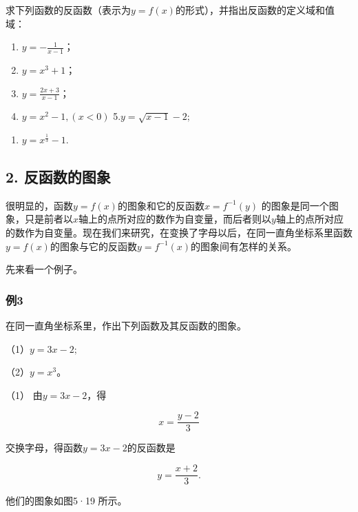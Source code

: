 求下列函数的反函数（表示为\(y=f(x)\)的形式），并指出反函数的定义域和值域：

\begin{enumerate}[start=1]
\item
  \(y = -\frac{1}{x - 1}\)；
\item
  \(y = x^{3} + 1\)；
\item
  \(y = \frac{2x + 3}{x - 1}\)；
\item
  \(y = x^{2} - 1, (x < 0)\) 5.\(y = \sqrt{x - 1} - 2;\)
\end{enumerate}
\begin{enumerate}[start=6]
\item
  \(y = x^{\frac{1}{3}} - 1.\)
\end{enumerate}

\subsection{2. 反函数的图象}

很明显的，函数\(y = f(x)\)的图象和它的反函数\(x = f^{-1}(y)\)
的图象是同一个图象，只是前者以\(x\)轴上的点所对应的数作为自变量，而后者则以\(y\)轴上的点所对应的数作为自变量。现在我们来研究，在变换了字母以后，在同一直角坐标系里函数\(y = f(x)\)的图象与它的反函数\(y=f^{-1}(x)\)的图象间有怎样的关系。

先来看一个例子。

\subsubsection{例3}

在同一直角坐标系里，作出下列函数及其反函数的图象。

（1）\(y = 3x - 2;\)

（2）\(y=x^3\)。

 （1） 由\(y = 3x - 2\)，得

\[
x = \frac{y - 2}{3}
\]

交换字母，得函数\(y=3x-2\)的反函数是

\[
y=\frac{x+2}{3}.
\]

他们的图象如图5·19 所示。

